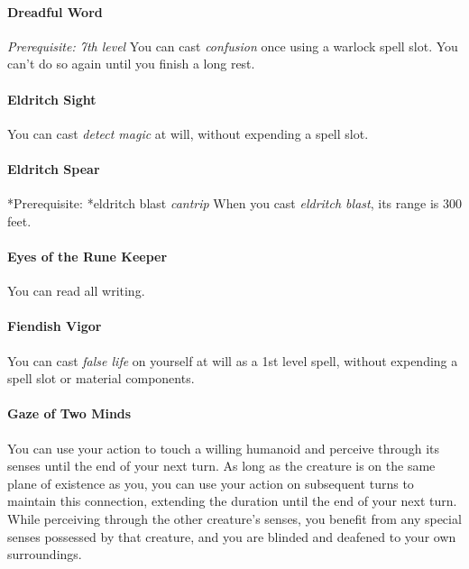 \documentclass[
]{article}
\begin{document}
\hypertarget{dreadful-word}{%
\paragraph{Dreadful Word}\label{dreadful-word}}

\emph{Prerequisite: 7th level} You can cast \emph{confusion} once using
a warlock spell slot. You can't do so again until you finish a long
rest.

\hypertarget{eldritch-sight}{%
\paragraph{Eldritch Sight}\label{eldritch-sight}}

You can cast \emph{detect magic} at will, without expending a spell
slot.

\hypertarget{eldritch-spear}{%
\paragraph{Eldritch Spear}\label{eldritch-spear}}

*Prerequisite: *eldritch blast \emph{cantrip} When you cast
\emph{eldritch blast}, its range is 300 feet.

\hypertarget{eyes-of-the-rune-keeper}{%
\paragraph{Eyes of the Rune Keeper}\label{eyes-of-the-rune-keeper}}

You can read all writing.

\hypertarget{fiendish-vigor}{%
\paragraph{Fiendish Vigor}\label{fiendish-vigor}}

You can cast \emph{false life} on yourself at will as a 1st level spell,
without expending a spell slot or material components.

\hypertarget{gaze-of-two-minds}{%
\paragraph{Gaze of Two Minds}\label{gaze-of-two-minds}}

You can use your action to touch a willing humanoid and perceive through
its senses until the end of your next turn. As long as the creature is
on the same plane of existence as you, you can use your action on
subsequent turns to maintain this connection, extending the duration
until the end of your next turn. While perceiving through the other
creature's senses, you benefit from any special senses possessed by that
creature, and you are blinded and deafened to your own surroundings.
\end{document}

